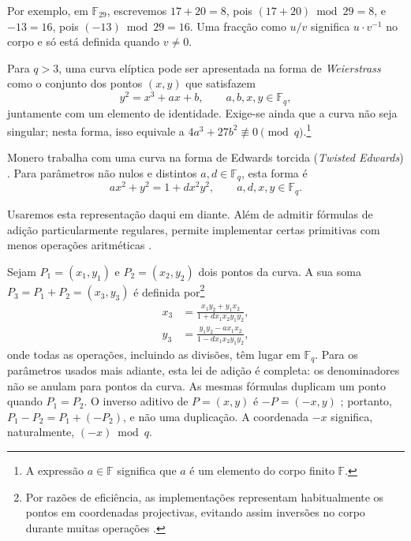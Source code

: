Por exemplo, em \(\mathbb{F}_{29}\), escrevemos \(17+20=8\), pois
\((17+20)\bmod29=8\), e \(-13=16\), pois \((-13)\bmod29=16\). Uma fracção
como \(u/v\) significa \(u\cdot v^{-1}\) no corpo e só está definida quando
\(v\ne0\).

Para \(q>3\), uma curva elíptica pode ser apresentada na forma de {\em Weierstrass}
\cite{Hankerson:2003:GEC:940321} como o conjunto dos pontos \((x,y)\) que
satisfazem
\[
y^2=x^3+ax+b,\qquad a,b,x,y\in\mathbb{F}_q,
\]
juntamente com um elemento de identidade. Exige-se ainda que a curva não seja
singular; nesta forma, isso equivale a
\(4a^3+27b^2\not\equiv0\pmod q\).\footnote{\label{notation1}A expressão
\(a\in\mathbb{F}\) significa que \(a\) é um elemento do corpo finito
\(\mathbb{F}\).}

Monero trabalha com uma curva na forma de Edwards torcida ({\em Twisted
Edwards}) \cite{Bernstein2008}.
 Para parâmetros não nulos e distintos
\(a,d\in\mathbb{F}_q\), esta forma é
\[
ax^2+y^2=1+dx^2y^2,\qquad a,d,x,y\in\mathbb{F}_q.
\]

Usaremos esta representação daqui em diante. Além de admitir fórmulas de
adição particularmente regulares, permite implementar certas primitivas com
menos operações aritméticas \cite{Bernstein2007}.

%
Sejam \(P_1=(x_1,y_1)\) e \(P_2=(x_2,y_2)\) dois pontos da curva. A sua soma
\(P_3=P_1+P_2=(x_3,y_3)\) é definida por\footnote{Por razões de eficiência, as
implementações representam habitualmente os pontos em coordenadas
projectivas, evitando assim inversões no corpo durante muitas operações
\cite{ecc-projective}.}
\begin{align*}
x_3&=\frac{x_1y_2+y_1x_2}{1+dx_1x_2y_1y_2},\\
y_3&=\frac{y_1y_2-ax_1x_2}{1-dx_1x_2y_1y_2},
\end{align*}
onde todas as operações, incluindo as divisões, têm lugar em \(\mathbb{F}_q\).
Para os parâmetros usados mais adiante, esta lei de adição é completa: os
denominadores não se anulam para pontos da curva. As mesmas fórmulas duplicam
um ponto quando \(P_1=P_2\). O inverso aditivo de \(P=(x,y)\) é
\(-P=(-x,y)\) \cite{Bernstein2008}; portanto,
\(P_1-P_2=P_1+(-P_2)\), e não uma duplicação. A coordenada \(-x\) significa,
naturalmente, \((-x)\bmod q\).

